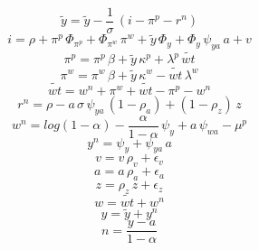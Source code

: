 \begin{dmath}
{{\tilde{y}}}={{\tilde{y}}}-\frac{1}{{{\sigma}}}\, \left({{i}}-{{\pi^p}}-{{r^n}}\right)
\end{dmath}
\begin{dmath}
{{i}}={{\rho}}+{{\pi^p}}\, {{\Phi_{\pi^p}}}+{{\Phi_{\pi^w}}}\, {{\pi^w}}+{{\tilde{y}}}\, {{\Phi_{y}}}+{{\Phi_{y}}}\, {{\psi_{ya}}}\, {{a}}+{{v}}
\end{dmath}
\begin{dmath}
{{\pi^p}}={{\pi^p}}\, {{\beta}}+{{\tilde{y}}}\, {{\kappa^p}}+{{\lambda^p}}\, {{\tilde{wt}}}
\end{dmath}
\begin{dmath}
{{\pi^w}}={{\pi^w}}\, {{\beta}}+{{\tilde{y}}}\, {{\kappa^w}}-{{\tilde{wt}}}\, {{\lambda^w}}
\end{dmath}
\begin{dmath}
{{\tilde{wt}}}={{w^n}}+{{\pi^w}}+{{\tilde{wt}}}-{{\pi^p}}-{{w^n}}
\end{dmath}
\begin{dmath}
{{r^n}}={{\rho}}-{{a}}\, {{\sigma}}\, {{\psi_{ya}}}\, \left(1-{{\rho_a}}\right)+\left(1-{{\rho_z}}\right)\, {{z}}
\end{dmath}
\begin{dmath}
{{w^n}}=log\left(1-{{\alpha}}\right)-\frac{{{\alpha}}}{1-{{\alpha}}}\, {{\psi_{y}}}+{{a}}\, {{\psi_{wa}}}-{{\mu^p}}
\end{dmath}
\begin{dmath}
{{y^n}}={{\psi_{y}}}+{{\psi_{ya}}}\, {{a}}
\end{dmath}
\begin{dmath}
{{v}}={{v}}\, {{\rho_v}}+{{\epsilon_v}}
\end{dmath}
\begin{dmath}
{{a}}={{a}}\, {{\rho_a}}+{{\epsilon_a}}
\end{dmath}
\begin{dmath}
{{z}}={{\rho_z}}\, {{z}}+{{\epsilon_z}}
\end{dmath}
\begin{dmath}
{{w}}={{\tilde{wt}}}+{{w^n}}
\end{dmath}
\begin{dmath}
{{y}}={{\tilde{y}}}+{{y^n}}
\end{dmath}
\begin{dmath}
{{n}}=\frac{{{y}}-{{a}}}{1-{{\alpha}}}
\end{dmath}
